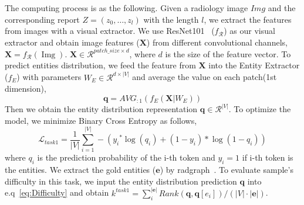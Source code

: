 \documentclass[sn-mathphys-num]{sn-jnl}%
\theoremstyle{thmstyleone}%
\theoremstyle{thmstyletwo}%
\theoremstyle{thmstylethree}%
\begin{document}
The computing process is as the following. 
Given a radiology image $Img$ and the corresponding report $Z =\left(z_{0}, \ldots, z_{l}\right)$ with the length $l$, we extract the features from images with a visual extractor. 
We use ResNet101~\cite{he2016deep} ($f_{\mathcal{R}}$) as our visual extractor and obtain image features ($\mathbf{X}$) from different convolutional channels, $\mathbf{X} = f_{\mathcal{R}}(\operatorname{Img})$.
$\mathbf{X} \in \mathcal{R}^{patch\_size \times d}$, where $d$ is the size of the feature vector.
To predict entities distribution, we feed the feature from $\mathbf{X}$ into the Entity Extractor ($f_{E}$) with parameters $W_{E} \in \mathcal{R}^{d \times |V|}$ and average the value on each patch(1st dimension), 
\begin{equation}\label{entity distribution}
   \mathbf{q} = AVG_{:1}(f_{E}(\mathbf{X} | W_{E}))
\end{equation}
Then we obtain the entity distribution representation $\mathbf{q} \in  \mathcal{R}^{|V|}$. 
To optimize the model,  we minimize Binary Cross Entropy as follows,
 \begin{equation}\label{eq:nll}
    \mathcal{L}_{task1} = \frac{1}{|V|} \sum_{i=1}^{|V|}-\left(y_i{ }^* \log \left(q_i\right)+\left(1-y_i\right) * \log \left(1-q_i\right)\right)
 \end{equation}
 where $q_{i}$ is the prediction probability of the i-th token and $y_{i} = 1$ if i-th token is the entities. We extract the gold entities ($\mathbf{e}$) by radgraph~\cite{jain2021radgraph}.
To evaluate sample's difficulty in this task, we input the entity distribution prediction $\mathbf{q}$ into e.q~\ref{eq:Difficulty} and obtain
    $k^{task1} = \sum_{i}^{|\mathbf{e}|} Rank(\mathbf{q},\mathbf{q}[e_{i}])/( |V| \cdot |\mathbf{e}|)$.



\end{document}
